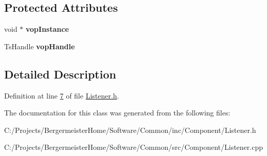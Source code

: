 \subsection*{Protected Attributes}
\begin{DoxyCompactItemize}
\item 
\mbox{\label{class_g_n_common_1_1_g_n_component_1_1_g_tc_listener_aab044fbbc2280b4577d9e8103885c9e0}} 
void $\ast$ {\bfseries vop\+Instance}
\item 
\mbox{\label{class_g_n_common_1_1_g_n_component_1_1_g_tc_listener_a0c5e4d4c379d166023eb2c35b1fae166}} 
Ts\+Handle {\bfseries vop\+Handle}
\end{DoxyCompactItemize}


\subsection{Detailed Description}


Definition at line \mbox{\hyperlink{_listener_8h_source_l00007}{7}} of file \mbox{\hyperlink{_listener_8h_source}{Listener.\+h}}.



The documentation for this class was generated from the following files\+:\begin{DoxyCompactItemize}
\item 
C\+:/\+Projects/\+Bergermeister\+Home/\+Software/\+Common/inc/\+Component/Listener.\+h\item 
C\+:/\+Projects/\+Bergermeister\+Home/\+Software/\+Common/src/\+Component/Listener.\+cpp\end{DoxyCompactItemize}
